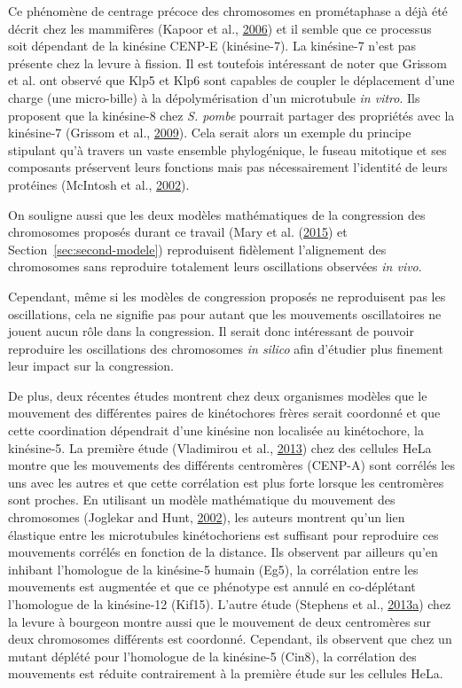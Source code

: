 \documentclass[12pt,a4paper,twoside,openright]{book}
\begin{document}
Ce phénomène de centrage précoce des chromosomes en prométaphase a déjà
été décrit chez les mammifères (Kapoor et al.,
\protect\hyperlink{ref-Kapoor2006}{2006}) et il semble que ce processus
soit dépendant de la kinésine CENP-E (kinésine-7). La kinésine-7 n'est
pas présente chez la levure à fission. Il est toutefois intéressant de
noter que Grissom et al. ont observé que Klp5 et Klp6 sont capables de
coupler le déplacement d'une charge (une micro-bille) à la
dépolymérisation d'un microtubule \emph{in vitro}. Ils proposent que la
kinésine-8 chez \emph{S. pombe} pourrait partager des propriétés avec la
kinésine-7 (Grissom et al., \protect\hyperlink{ref-Grissom2009}{2009}).
Cela serait alors un exemple du principe stipulant qu'à travers un vaste
ensemble phylogénique, le fuseau mitotique et ses composants préservent
leurs fonctions mais pas nécessairement l'identité de leurs protéines
(McIntosh et al., \protect\hyperlink{ref-McIntosh2002b}{2002}).

On souligne aussi que les deux modèles mathématiques de la congression
des chromosomes proposés durant ce travail (Mary et al.
(\protect\hyperlink{ref-Mary2015}{2015}) et
Section~\ref{sec:second-modele}) reproduisent fidèlement l'alignement
des chromosomes sans reproduire totalement leurs oscillations observées
\emph{in vivo}.

Cependant, même si les modèles de congression proposés ne reproduisent
pas les oscillations, cela ne signifie pas pour autant que les
mouvements oscillatoires ne jouent aucun rôle dans la congression. Il
serait donc intéressant de pouvoir reproduire les oscillations des
chromosomes \emph{in silico} afin d'étudier plus finement leur impact
sur la congression.

De plus, deux récentes études montrent chez deux organismes modèles que
le mouvement des différentes paires de kinétochores frères serait
coordonné et que cette coordination dépendrait d'une kinésine non
localisée au kinétochore, la kinésine-5. La première étude (Vladimirou
et al., \protect\hyperlink{ref-Vladimirou2013}{2013}) chez des cellules
HeLa montre que les mouvements des différents centromères (CENP-A) sont
corrélés les uns avec les autres et que cette corrélation est plus forte
lorsque les centromères sont proches. En utilisant un modèle
mathématique du mouvement des chromosomes (Joglekar and Hunt,
\protect\hyperlink{ref-Joglekar2002}{2002}), les auteurs montrent qu'un
lien élastique entre les microtubules kinétochoriens est suffisant pour
reproduire ces mouvements corrélés en fonction de la distance. Ils
observent par ailleurs qu'en inhibant l'homologue de la kinésine-5
humain (Eg5), la corrélation entre les mouvements est augmentée et que
ce phénotype est annulé en co-déplétant l'homologue de la kinésine-12
(Kif15). L'autre étude (Stephens et al.,
\protect\hyperlink{ref-Stephens2013}{2013}\protect\hyperlink{ref-Stephens2013}{a})
chez la levure à bourgeon montre aussi que le mouvement de deux
centromères sur deux chromosomes différents est coordonné. Cependant,
ils observent que chez un mutant déplété pour l'homologue de la
kinésine-5 (Cin8), la corrélation des mouvements est réduite
contrairement à la première étude sur les cellules HeLa.
\end{document}
